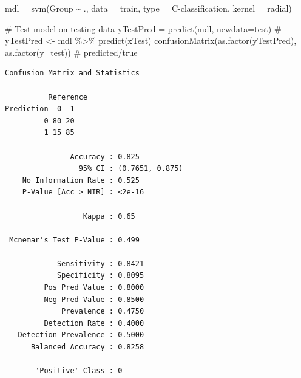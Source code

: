 \documentclass[
  letterpaper,
  DIV=11,
  numbers=noendperiod]{scrartcl}
\newenvironment{Shaded}{\begin{snugshade}}{\end{snugshade}}
\newcommand{\AttributeTok}[1]{\textcolor[rgb]{0.40,0.45,0.13}{#1}}
\newcommand{\CommentTok}[1]{\textcolor[rgb]{0.37,0.37,0.37}{#1}}
\newcommand{\FunctionTok}[1]{\textcolor[rgb]{0.28,0.35,0.67}{#1}}
\newcommand{\NormalTok}[1]{\textcolor[rgb]{0.00,0.23,0.31}{#1}}
\newcommand{\OtherTok}[1]{\textcolor[rgb]{0.00,0.23,0.31}{#1}}
\newcommand{\SpecialCharTok}[1]{\textcolor[rgb]{0.37,0.37,0.37}{#1}}
\newcommand{\StringTok}[1]{\textcolor[rgb]{0.13,0.47,0.30}{#1}}
\begin{document}
\begin{Shaded}
\begin{Highlighting}[]
\NormalTok{mdl }\OtherTok{=} \FunctionTok{svm}\NormalTok{(Group }\SpecialCharTok{\textasciitilde{}}\NormalTok{ .,}
                 \AttributeTok{data =}\NormalTok{ train,}
                 \AttributeTok{type =} \StringTok{\textquotesingle{}C{-}classification\textquotesingle{}}\NormalTok{,}
                 \AttributeTok{kernel =} \StringTok{\textquotesingle{}radial\textquotesingle{}}\NormalTok{)}

\CommentTok{\# Test model on testing data}
\NormalTok{yTestPred }\OtherTok{=} \FunctionTok{predict}\NormalTok{(mdl, }\AttributeTok{newdata=}\NormalTok{test)}
\CommentTok{\# yTestPred \textless{}{-} mdl \%\textgreater{}\% predict(xTest) }
\FunctionTok{confusionMatrix}\NormalTok{(}\FunctionTok{as.factor}\NormalTok{(yTestPred), }\FunctionTok{as.factor}\NormalTok{(y\_test)) }\CommentTok{\# predicted/true}
\end{Highlighting}
\end{Shaded}

\begin{verbatim}
Confusion Matrix and Statistics

          Reference
Prediction  0  1
         0 80 20
         1 15 85
                                         
               Accuracy : 0.825          
                 95% CI : (0.7651, 0.875)
    No Information Rate : 0.525          
    P-Value [Acc > NIR] : <2e-16         
                                         
                  Kappa : 0.65           
                                         
 Mcnemar's Test P-Value : 0.499          
                                         
            Sensitivity : 0.8421         
            Specificity : 0.8095         
         Pos Pred Value : 0.8000         
         Neg Pred Value : 0.8500         
             Prevalence : 0.4750         
         Detection Rate : 0.4000         
   Detection Prevalence : 0.5000         
      Balanced Accuracy : 0.8258         
                                         
       'Positive' Class : 0              
                                         
\end{verbatim}
\end{document}
